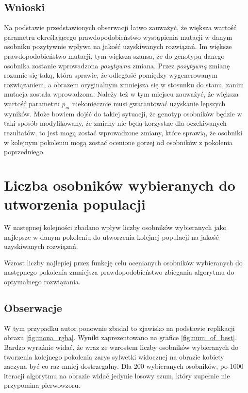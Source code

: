 \subsection{Wnioski}
Na podstawie przedstawionych obserwacji łatwo zauważyć, że większa wartość parametru określającego prawdopodobieństwo wystąpienia mutacji w danym osobniku pozytywnie wpływa na jakość uzyskiwanych rozwiązań. Im większe prawdopodobieństwo mutacji, tym większa szansa, że do genotypu danego osobnika zostanie wprowadzona \textit{pozytywna} zmiana. Przez \textit{pozytywną} zmianę rozumie się taką, która sprawie, że odległość pomiędzy wygenerowanym rozwiązaniem, a obrazem oryginalnym zmniejsza się w stosunku do stanu, zanim mutacja została wprowadzona. Należy też w tym miejscu zauważyć, że większa wartość parametru $p_{m}$ niekoniecznie musi gwarantować uzyskanie lepszych wyników. Może bowiem dojść do takiej sytuacji, że genotyp osobników będzie w taki sposób modyfikowany, że zmiany nie będą korzystne dla oczekiwanych rezultatów, to jest mogą zostać wprowadzone zmiany, które sprawią, że osobniki w kolejnym pokoleniu mogą zostać ocenione gorzej od osobników z pokolenia poprzedniego.

\section{Liczba osobników wybieranych do utworzenia populacji}
W następnej kolejności zbadano wpływ liczby osobników wybieranych jako najlepsze w danym pokoleniu do utworzenia kolejnej populacji na jakość uzyskiwanych rozwiązań. 

\begin{hypothesis}
Wzrost liczby najlepiej przez funkcję celu ocenianych osobników wybieranych do następnego pokolenia zmniejsza prawdopodobieństwo zbiegania algorytmu do optymalnego rozwiązania.
\end{hypothesis}

\subsection{Obserwacje}
W tym przypadku autor ponownie zbadał to zjawisko na podstawie replikacji obrazu \ref{fig:mona_rgba}. Wyniki zaprezentowano na grafice \ref{fig:num_of_best}. Bardzo wyraźnie widać, że wraz ze wzrostem liczby osobników wybieranych do tworzenia kolejnego pokolenia zarys sylwetki widocznej na obrazie kobiety zaczyna być co raz mniej dostrzegalny. Dla 200 wybieranych osobników, po 1000 iteracji algorytmu na obrazie widać jedynie losowy szum, który zupełnie nie przypomina pierwowzoru. 


